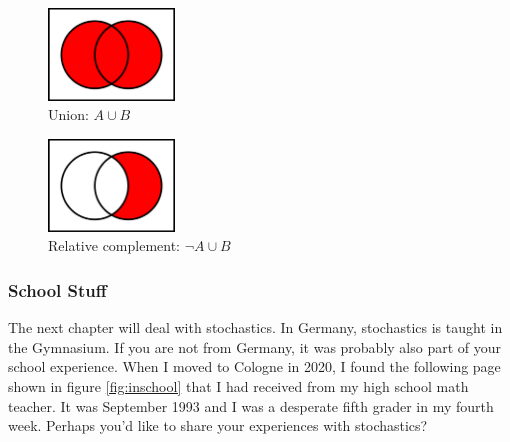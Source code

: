 \documentclass[
  12pt,
  oneside]{book}
\theoremstyle{definition}
\theoremstyle{definition}
\theoremstyle{definition}
\theoremstyle{definition}
\theoremstyle{remark}
\begin{document}
\begin{figure}
\centering
\includegraphics[width=0.3\textwidth,height=\textheight]{fig/union.png}
\caption{\label{fig:bfig} Union: \(A \cup B\)}
\end{figure}

\begin{figure}
\centering
\includegraphics[width=0.3\textwidth,height=\textheight]{fig/notA.png}
\caption{\label{fig:cfig} Relative complement: \(\neg A \cup B\)}
\end{figure}

\hypertarget{school-stuff}{%
\subsubsection*{School Stuff}\label{school-stuff}}

The next chapter will deal with stochastics. In Germany, stochastics is taught in the Gymnasium. If you are not from Germany, it was probably also part of your school experience. When I moved to Cologne in 2020, I found the following page shown in figure \ref{fig:inschool} that I had received from my high school math teacher. It was September 1993 and I was a desperate fifth grader in my fourth week. Perhaps you'd like to share your experiences with stochastics?
\end{document}
